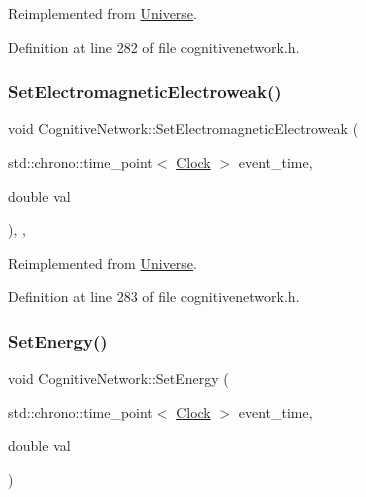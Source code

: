 Reimplemented from \hyperlink{class_universe_aa981fc7e252b1fbbb675f0371860954d}{Universe}.



Definition at line 282 of file cognitivenetwork.\+h.

\mbox{\label{class_cognitive_network_a270f6842ec14b3e5b80dedf7b48ea6f4}} 
\subsubsection{\texorpdfstring{Set\+Electromagnetic\+Electroweak()}{SetElectromagneticElectroweak()}}
{\footnotesize\ttfamily void Cognitive\+Network\+::\+Set\+Electromagnetic\+Electroweak (\begin{DoxyParamCaption}\item[{std\+::chrono\+::time\+\_\+point$<$ \hyperlink{universe_8h_a0ef8d951d1ca5ab3cfaf7ab4c7a6fd80}{Clock} $>$}]{event\+\_\+time,  }\item[{double}]{val }\end{DoxyParamCaption})\hspace{0.3cm}{\ttfamily [inline]}, {\ttfamily [final]}, {\ttfamily [virtual]}}



Reimplemented from \hyperlink{class_universe_a608aa95698380f791a0ffba45cc1bee3}{Universe}.



Definition at line 283 of file cognitivenetwork.\+h.

\mbox{\label{class_cognitive_network_af2f96107858445a0b7be2be6af5b5c01}} 
\subsubsection{\texorpdfstring{Set\+Energy()}{SetEnergy()}}
{\footnotesize\ttfamily void Cognitive\+Network\+::\+Set\+Energy (\begin{DoxyParamCaption}\item[{std\+::chrono\+::time\+\_\+point$<$ \hyperlink{universe_8h_a0ef8d951d1ca5ab3cfaf7ab4c7a6fd80}{Clock} $>$}]{event\+\_\+time,  }\item[{double}]{val }\end{DoxyParamCaption})\hspace{0.3cm}{\ttfamily [inline]}}



